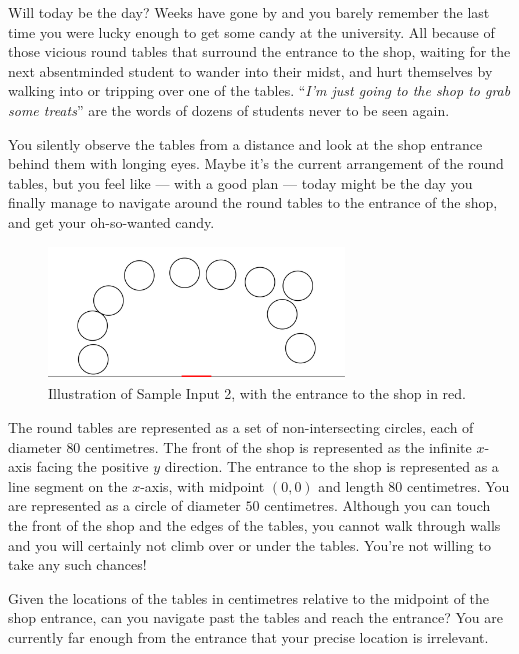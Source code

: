
%
Will today be the day? Weeks have gone by and you barely remember the last time
you were lucky enough to get some candy at the university. All because of those
vicious round tables that surround the entrance to the shop, waiting for the
next absentminded student to wander into their midst, and hurt themselves by
walking into or tripping over one of the tables. ``\textit{I'm just going to
the shop to grab some treats}'' are the words of dozens of students never to be
seen again.

You silently observe the tables from a distance and look at the shop entrance
behind them with longing eyes. Maybe it's the current arrangement of the round
tables, but you feel like --- with a good plan --- today might be the day you
finally manage to navigate around the round tables to the entrance of the shop,
and get your oh-so-wanted candy.

\begin{figure}[h!]
  \centering
  \includegraphics[width=0.70\textwidth]{figure}
  \caption{Illustration of Sample Input 2, with the entrance to the shop in red.}%
  \label{fig:sample2}
\end{figure}

The round tables are represented as a set of non-intersecting circles, each of
diameter $80$ centimetres. The front of the shop is represented as the infinite
$x$-axis facing the positive $y$ direction. The entrance to the shop is
represented as a line segment on the $x$-axis, with midpoint $(0,0)$ and length
$80$ centimetres. You are represented as a circle of diameter $50$ centimetres.
Although you can touch the front of the shop and the edges of the tables, you
cannot walk through walls and you will certainly not climb over or under the
tables. You're not willing to take any such chances!

Given the locations of the tables in centimetres relative to the midpoint of
the shop entrance, can you navigate past the tables and reach the entrance?
You are currently far enough from the entrance that your precise location is
irrelevant.

